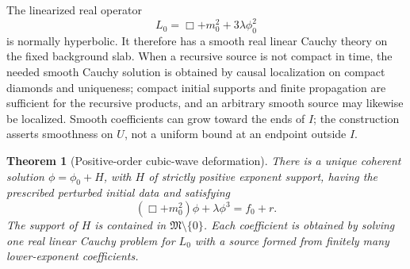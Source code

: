 \documentclass[11pt,letterpaper]{article}
\newtheorem{theorem}{Theorem}[section]
\theoremstyle{definition}
\theoremstyle{remark}
\begin{document}
The linearized real operator
\begin{equation}\label{vtf:mink:eq:linearized}
 L_0=\Box+m_0^2+3\lambda\phi_0^2
\end{equation}
is normally hyperbolic. It therefore has a smooth real linear Cauchy theory on the fixed background slab. When a recursive source is not compact in time, the needed smooth Cauchy solution is obtained by causal localization on compact diamonds and uniqueness; compact initial supports and finite propagation are sufficient for the recursive products, and an arbitrary smooth source may likewise be localized. Smooth coefficients can grow toward the ends of $I$; the construction asserts smoothness on $U$, not a uniform bound at an endpoint outside $I$.

\begin{theorem}[Positive-order cubic-wave deformation]\label{vtf:mink:thm:cubic}
There is a unique coherent solution $\phi=\phi_0+H$, with $H$ of strictly positive exponent support, having the prescribed perturbed initial data and satisfying
\begin{equation}\label{vtf:mink:eq:cubic}
 (\Box+m_0^2)\phi+\lambda\phi^3=f_0+r.
\end{equation}
The support of $H$ is contained in $\mathfrak M\setminus\{0\}$. Each coefficient is obtained by solving one real linear Cauchy problem for $L_0$ with a source formed from finitely many lower-exponent coefficients.
\end{theorem}
\end{document}
